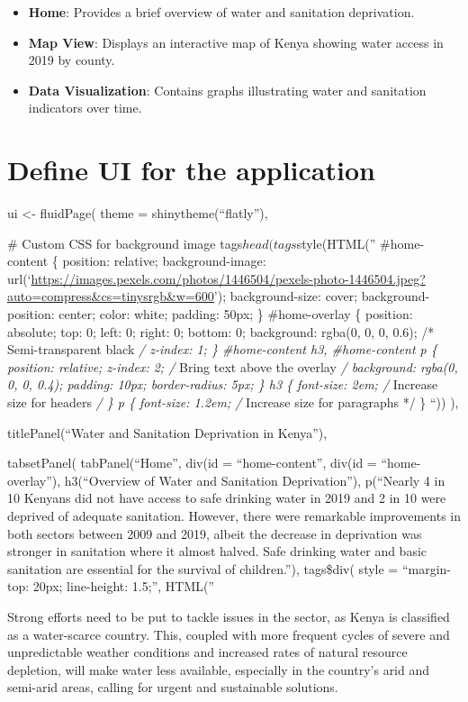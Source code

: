 \documentclass[
]{article}
\providecommand{\tightlist}{%
  \setlength{\itemsep}{0pt}\setlength{\parskip}{0pt}}
\begin{document}
\begin{itemize}
\tightlist
\item
  \textbf{Home}: Provides a brief overview of water and sanitation
  deprivation.
\item
  \textbf{Map View}: Displays an interactive map of Kenya showing water
  access in 2019 by county.
\item
  \textbf{Data Visualization}: Contains graphs illustrating water and
  sanitation indicators over time.
\end{itemize}

\section{Define UI for the
application}\label{define-ui-for-the-application}

ui \textless- fluidPage( theme = shinytheme(``flatly''),

\# Custom CSS for background image tags\(head(
    tags\)style(HTML('' \#home-content \{ position: relative;
background-image:
url(`\url{https://images.pexels.com/photos/1446504/pexels-photo-1446504.jpeg?auto=compress&cs=tinysrgb&w=600}');
background-size: cover; background-position: center; color: white;
padding: 50px; \} \#home-overlay \{ position: absolute; top: 0; left: 0;
right: 0; bottom: 0; background: rgba(0, 0, 0, 0.6); /* Semi-transparent
black \emph{/ z-index: 1; \} \#home-content h3, \#home-content p \{
position: relative; z-index: 2; /} Bring text above the overlay \emph{/
background: rgba(0, 0, 0, 0.4); padding: 10px; border-radius: 5px; \} h3
\{ font-size: 2em; /} Increase size for headers \emph{/ \} p \{
font-size: 1.2em; /} Increase size for paragraphs */ \} ``)) ),

titlePanel(``Water and Sanitation Deprivation in Kenya''),

tabsetPanel( tabPanel(``Home'', div(id = ``home-content'', div(id =
``home-overlay''), h3(``Overview of Water and Sanitation Deprivation''),
p(``Nearly 4 in 10 Kenyans did not have access to safe drinking water in
2019 and 2 in 10 were deprived of adequate sanitation. However, there
were remarkable improvements in both sectors between 2009 and 2019,
albeit the decrease in deprivation was stronger in sanitation where it
almost halved. Safe drinking water and basic sanitation are essential
for the survival of children.''), tags\$div( style = ``margin-top: 20px;
line-height: 1.5;'', HTML(''

Strong efforts need to be put to tackle issues in the sector, as Kenya
is classified as a water-scarce country. This, coupled with more
frequent cycles of severe and unpredictable weather conditions and
increased rates of natural resource depletion, will make water less
available, especially in the country's arid and semi-arid areas, calling
for urgent and sustainable solutions.
\end{document}
